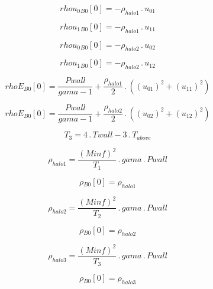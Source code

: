 \documentclass{article}
\begin{document}
\begin{dmath}{rhou_{0}{_{B0}}}[{0}] = - \rho_{halo 1} \,.\, u_{01}\end{dmath}

\begin{dmath}{rhou_{1}{_{B0}}}[{0}] = - \rho_{halo 1} \,.\, u_{11}\end{dmath}

\begin{dmath}{rhou_{0}{_{B0}}}[{0}] = - \rho_{halo 2} \,.\, u_{02}\end{dmath}

\begin{dmath}{rhou_{1}{_{B0}}}[{0}] = - \rho_{halo 2} \,.\, u_{12}\end{dmath}

\begin{dmath}{rhoE{_{B0}}}[{0}] = \frac{Pwall}{gama - 1} + \frac{\rho_{halo 1}}{2} \,.\, \left(\left(u_{01} \right)^{2} + \left(u_{11} \right)^{2}\right)\end{dmath}

\begin{dmath}{rhoE{_{B0}}}[{0}] = \frac{Pwall}{gama - 1} + \frac{\rho_{halo 2}}{2} \,.\, \left(\left(u_{02} \right)^{2} + \left(u_{12} \right)^{2}\right)\end{dmath}

\begin{dmath}T_{3} = 4 \,.\, Twall - 3 \,.\, T_{above}\end{dmath}

\begin{dmath}\rho_{halo 1} = \frac{\left(Minf \right)^{2}}{T_{1}} \,.\, gama \,.\, Pwall\end{dmath}

\begin{dmath}{\rho{_{B0}}}[{0}] = \rho_{halo 1}\end{dmath}

\begin{dmath}\rho_{halo 2} = \frac{\left(Minf \right)^{2}}{T_{2}} \,.\, gama \,.\, Pwall\end{dmath}

\begin{dmath}{\rho{_{B0}}}[{0}] = \rho_{halo 2}\end{dmath}

\begin{dmath}\rho_{halo 3} = \frac{\left(Minf \right)^{2}}{T_{3}} \,.\, gama \,.\, Pwall\end{dmath}

\begin{dmath}{\rho{_{B0}}}[{0}] = \rho_{halo 3}\end{dmath}
\end{document}
